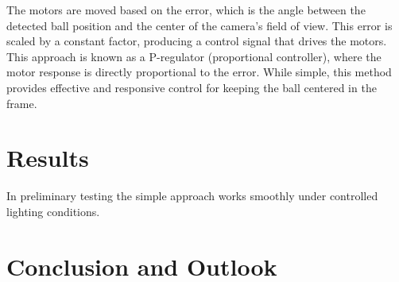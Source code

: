 \documentclass[
    parskip=half, 
    twoside=false,
    twocolumn=true,
    fontsize=12pt,
]{scrarticle}
\begin{document}
The motors are moved based on the error, which is the angle between the detected ball position and the center of the camera's field of view. This error is scaled by a constant factor, producing a control signal that drives the motors. This approach is known as a P-regulator (proportional controller), where the motor response is directly proportional to the error. While simple, this method provides effective and responsive control for keeping the ball centered in the frame.

\section{Results}
In preliminary testing the simple approach works smoothly under controlled lighting conditions. 

\section{Conclusion and Outlook}
\end{document}
